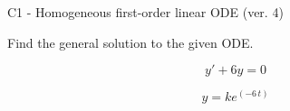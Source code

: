 \begin{exercise}
  \begin{exerciseTitle}C1 - Homogeneous first-order linear ODE (ver. 4)\end{exerciseTitle}
  \begin{exerciseStatement}
    
Find the general solution to the given ODE.

    
\[y'+6y=0\]

  \end{exerciseStatement}
  \begin{exerciseAnswer}
    
\[y= k e^{\left(-6 \, t\right)}\]

  \end{exerciseAnswer}
\end{exercise}